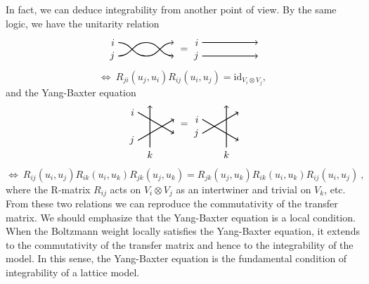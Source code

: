 In fact, we can deduce integrability from another point of view. By
the same logic, we have the unitarity relation
\begin{equation}
    \begin{tikzpicture}[yscale=0.6, baseline=(x.base)]
        \node (x) at (0,0) {\vphantom{x}};

        \draw[thick, ->] (0,0.4) node[left] {$i$} to[out=0, in=180] (1,-0.4) to [out=0, in=180] (2,0.4);
        \draw[thick, ->] (0,-0.4) node[left] {$j$} to[out=0, in=180] (1,0.4) to [out=0, in=180] (2,-0.4);

    \end{tikzpicture}
  \ =
    \begin{tikzpicture}[yscale=0.6, baseline=(x.base)]
        \node (x) at (0,0) {\vphantom{x}};

        \draw[thick, ->] (0,0.4) node[left] {$i$} -- (2,0.4);
        \draw[thick, ->] (0,-0.4) node[left] {$j$} -- (2,-0.4);

    \end{tikzpicture}
\end{equation}
\begin{equation}
    \Longleftrightarrow ~ R_{ji}(u_{j},u_{i})R_{ij}(u_{i},u_{j})  =  \mathrm{id}_{V_{i}\otimes V_{j}},
\end{equation}
and the Yang-Baxter equation
\begin{equation}
    \begin{tikzpicture}[scale=0.5, baseline=(x.base)]
        \node (x) at (30:2) {};

        \draw[thick, ->] (0,0) node[left] {$j$} -- ++(30:3);
        \draw[thick, ->] (0,2) node[left] {$i$} -- ++(-30:3);
        \draw[thick, ->] (-30:1) node[below] {$k$} -- ++(0,3);

    \end{tikzpicture}
  \ =
    \begin{tikzpicture}[scale=0.5, baseline=(x.base)]
        \node (x) at (30:1) {};

        \draw[thick, ->] (0,0) node[left] {$j$} -- ++(30:3);
        \draw[thick, ->] (0,1) node[left] {$i$} -- ++(-30:3);
        \draw[thick, ->] (-30:2) node[below] {$k$} -- ++(0,3);

    \end{tikzpicture}
\end{equation}
\begin{equation}
  \Longleftrightarrow ~ R_{ij}(u_{i},u_{j})R_{ik}(u_{i},u_{k})R_{jk}(u_{j},u_{k})
    =  R_{jk}(u_{j},u_{k})R_{ik}(u_{i},u_{k})R_{ij}(u_{i},u_{j})
    ~ ,
\end{equation}
where the R-matrix $R_{ij}$ acts on $V_{i}\otimes V_{j}$ as an
intertwiner and trivial on $V_{k}$, etc. From these two relations
we can reproduce the commutativity of the transfer matrix. We should
emphasize that the Yang-Baxter equation is a local condition. When
the Boltzmann weight locally satisfies the Yang-Baxter equation, it
extends to the commutativity of the transfer matrix and hence to the
integrability of the model. In this sense, the Yang-Baxter equation
is the fundamental condition of integrability of a lattice model.



